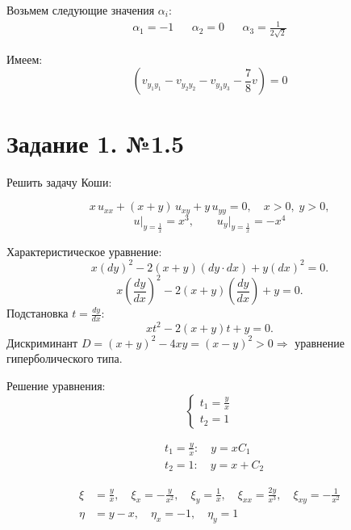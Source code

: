 \documentclass[a4paper,12pt]{article}
\begin{document}
    Возьмем следующие значения $\alpha_i$:
    \begin{align*}
        &\alpha_1 = -1& &\alpha_2 = 0& &\alpha_3 = \frac{1}{2\sqrt{2}}&
    \end{align*}

    Имеем:
    $$(v_{y_1y_1} - v_{y_2y_2} - v_{y_3y_3} - \frac{7}{8}v) = 0$$

\section{Задание 1. №1.5}
        
    Решить задачу Коши:
        
        \begin{equation*}
            x\,u_{xx} + (x+y)\,u_{xy} + y\,u_{yy}=0,\quad x>0,\;y>0,
        \end{equation*}
        \[
        u \Big|_{y=\frac{1}{x}} = x^3, \quad \quad  u_{y} \Big|_{y=\frac{1}{x}} = -x^4
        \]
        
        Характеристическое уравнение:
        \[
        x\left({dy}\right)^2 - 2(x+y)\left({dy}\cdot{dx}\right) + y\left({dx}\right)^2=0.
        \]
        \[
        x\left(\frac{dy}{dx}\right)^2 - 2(x+y)\left(\frac{dy}{dx}\right) + y=0.
        \]
        Подстановка $t = \frac{dy}{dx}$:
        \[
        xt^2 - 2(x+y)t + y=0.
        \]
        Дискриминант $D = (x+y)^2 - 4xy = (x-y)^2> 0 \Rightarrow$ уравнение гиперболического типа.
        
        Решение уравнения:
        \begin{equation*}
            \begin{cases}
            t_1 = \frac{y}{x} \\
            t_2 = 1
            \end{cases}
        \end{equation*}
        
        \begin{align*}
            &t_1 = \frac{y}{x}: \quad y = xC_1 \\
            &t_2 = 1: \quad y = x + C_2
        \end{align*}
        
        \begin{align*}
            \xi &= \frac{y}{x} , \quad \xi_x = -\frac{y}{x^2},  \quad \xi_y = \frac{1}{x},   \quad  \xi_{xx} = \frac{2y}{x^3},  \quad  \xi_{xy} = -\frac{1}{x^2} \\
            \eta &= y - x, \quad \eta_x = -1,  \quad \eta_y = 1
        \end{align*}
        
\end{document}
